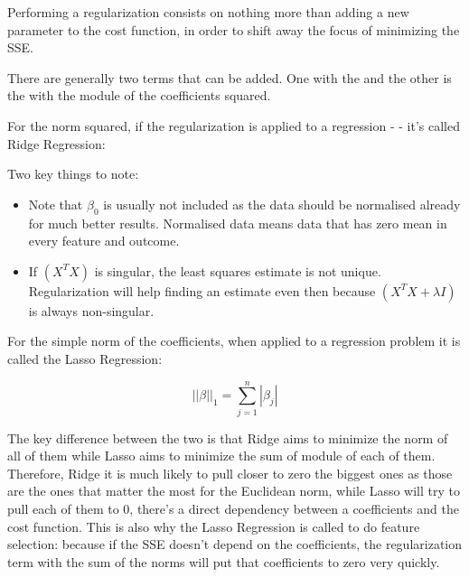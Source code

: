 Performing a regularization consists on nothing more than adding a new parameter to the cost function, in order to shift away the focus of minimizing the SSE.

There are generally two terms that can be added. One with the  and the other is the with the module of the coefficients squared.

For the norm squared, if the regularization is applied to a regression -  - it's called Ridge Regression:



Two key things to note:

\begin{itemize}
    \item Note that $\beta_0$ is usually not included as the data should be normalised already for much better results. Normalised data means data that has zero mean in every feature and outcome.
    \item If $\left(X^TX\right)$ is singular, the least squares estimate is not unique. Regularization will help finding an estimate even then because $\left(X^TX + \lambda I\right)$ is always non-singular.
\end{itemize}

For the simple norm of the coefficients, when applied to a regression problem it is called the Lasso Regression:


\begin{equation}
    ||\beta||_1 = \sum_{j=1}^{n} |\beta_j|
\end{equation}

The key difference between the two is that Ridge aims to minimize the norm of all of them while Lasso aims to minimize the sum of module of each of them. Therefore, Ridge it is much likely to pull closer to zero the biggest ones as those are the ones that matter the most for the Euclidean norm, while Lasso will try to pull each of them to 0, there's a direct dependency between a coefficients and the cost function. This is also why the Lasso Regression is called to do feature selection: because if the SSE doesn't depend on the coefficients, the regularization term with the sum of the norms will put that coefficients to zero very quickly.




